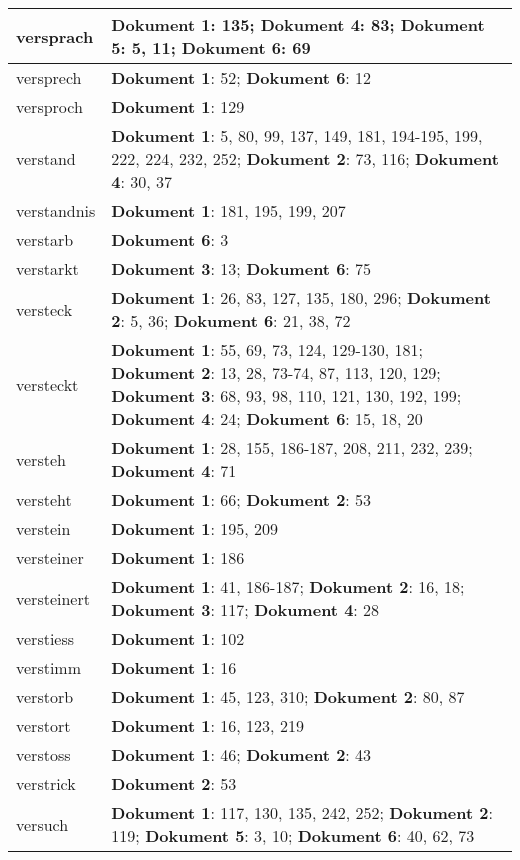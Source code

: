 \documentclass[a5paper]{article}
\begin{document}
\begin{longtable}[l]{|l|p{3in}|}
\hline
versprach & \textbf{Dokument 1}: 135; \textbf{Dokument 4}: 83; \textbf{Dokument 5}: 5, 11; \textbf{Dokument 6}: 69 \\
\hline
versprech & \textbf{Dokument 1}: 52; \textbf{Dokument 6}: 12 \\
\hline
versproch & \textbf{Dokument 1}: 129 \\
\hline
verstand & \textbf{Dokument 1}: 5, 80, 99, 137, 149, 181, 194-195, 199, 222, 224, 232, 252; \textbf{Dokument 2}: 73, 116; \textbf{Dokument 4}: 30, 37 \\
\hline
verstandnis & \textbf{Dokument 1}: 181, 195, 199, 207 \\
\hline
verstarb & \textbf{Dokument 6}: 3 \\
\hline
verstarkt & \textbf{Dokument 3}: 13; \textbf{Dokument 6}: 75 \\
\hline
versteck & \textbf{Dokument 1}: 26, 83, 127, 135, 180, 296; \textbf{Dokument 2}: 5, 36; \textbf{Dokument 6}: 21, 38, 72 \\
\hline
versteckt & \textbf{Dokument 1}: 55, 69, 73, 124, 129-130, 181; \textbf{Dokument 2}: 13, 28, 73-74, 87, 113, 120, 129; \textbf{Dokument 3}: 68, 93, 98, 110, 121, 130, 192, 199; \textbf{Dokument 4}: 24; \textbf{Dokument 6}: 15, 18, 20 \\
\hline
versteh & \textbf{Dokument 1}: 28, 155, 186-187, 208, 211, 232, 239; \textbf{Dokument 4}: 71 \\
\hline
versteht & \textbf{Dokument 1}: 66; \textbf{Dokument 2}: 53 \\
\hline
verstein & \textbf{Dokument 1}: 195, 209 \\
\hline
versteiner & \textbf{Dokument 1}: 186 \\
\hline
versteinert & \textbf{Dokument 1}: 41, 186-187; \textbf{Dokument 2}: 16, 18; \textbf{Dokument 3}: 117; \textbf{Dokument 4}: 28 \\
\hline
verstiess & \textbf{Dokument 1}: 102 \\
\hline
verstimm & \textbf{Dokument 1}: 16 \\
\hline
verstorb & \textbf{Dokument 1}: 45, 123, 310; \textbf{Dokument 2}: 80, 87 \\
\hline
verstort & \textbf{Dokument 1}: 16, 123, 219 \\
\hline
verstoss & \textbf{Dokument 1}: 46; \textbf{Dokument 2}: 43 \\
\hline
verstrick & \textbf{Dokument 2}: 53 \\
\hline
versuch & \textbf{Dokument 1}: 117, 130, 135, 242, 252; \textbf{Dokument 2}: 119; \textbf{Dokument 5}: 3, 10; \textbf{Dokument 6}: 40, 62, 73 \\

\end{longtable}
\end{document}
